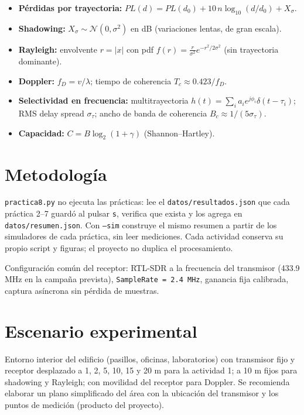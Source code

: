 \documentclass[11pt,a4paper]{article}
\begin{document}
\begin{itemize}
  \item \textbf{Pérdidas por trayectoria:} $PL(d) = PL(d_0) + 10\,n\log_{10}(d/d_0) + X_\sigma$.
  \item \textbf{Shadowing:} $X_\sigma \sim \mathcal{N}(0,\sigma^2)$ en dB (variaciones lentas, de gran escala).
  \item \textbf{Rayleigh:} envolvente $r=|x|$ con pdf $f(r)=\frac{r}{\sigma^2}e^{-r^2/2\sigma^2}$ (sin trayectoria dominante).
  \item \textbf{Doppler:} $f_D = v/\lambda$; tiempo de coherencia $T_c \approx 0.423/f_D$.
  \item \textbf{Selectividad en frecuencia:} multitrayectoria $h(t)=\sum_i a_i e^{j\phi_i}\delta(t-\tau_i)$; RMS delay spread $\sigma_\tau$; ancho de banda de coherencia $B_c \approx 1/(5\sigma_\tau)$.
  \item \textbf{Capacidad:} $C = B\log_2(1+\gamma)$ (Shannon--Hartley).
\end{itemize}

\section{Metodología}

\texttt{practica8.py} no ejecuta las prácticas: lee el \texttt{datos/resultados.json} que cada práctica 2--7 guardó al pulsar \texttt{s}, verifica que exista y los agrega en \texttt{datos/resumen.json}. Con \texttt{--sim} construye el mismo resumen a partir de los simuladores de cada práctica, sin leer mediciones. Cada actividad conserva su propio script y figuras; el proyecto no duplica el procesamiento.

Configuración común del receptor: RTL-SDR a la frecuencia del transmisor (433.9 MHz en la campaña prevista), \texttt{SampleRate = 2.4 MHz}, ganancia fija calibrada, captura asíncrona sin pérdida de muestras.

\section{Escenario experimental}

Entorno interior del edificio (pasillos, oficinas, laboratorios) con transmisor fijo y receptor desplazado a 1, 2, 5, 10, 15 y 20 m para la actividad 1; a 10 m fijos para shadowing y Rayleigh; con movilidad del receptor para Doppler. Se recomienda elaborar un plano simplificado del área con la ubicación del transmisor y los puntos de medición (producto del proyecto).
\end{document}
